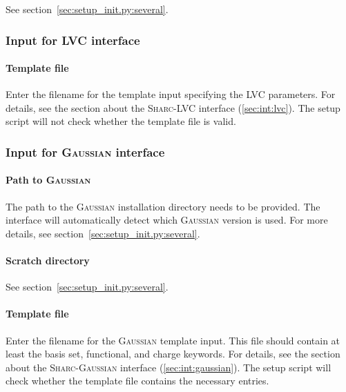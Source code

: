 \documentclass[a4paper,10pt,DIV=15,openany,twoside=false]{scrbook}
\newcommand{\sharc}{\textsc{Sharc}}
\begin{document}
See section~\ref{sec:setup_init.py:several}.


\subsubsection{Input for LVC interface}\label{sec:setup_init.py:lvc}

\paragraph{Template file}

Enter the filename for the template input specifying the LVC parameters. For details, see the section about the \sharc-LVC interface (\ref{sec:int:lvc}). The setup script will not check whether the template file is valid. 


\subsubsection{Input for \textsc{Gaussian} interface}\label{sec:setup_init.py:gaussian}

\paragraph{Path to \textsc{Gaussian}}

The path to the \textsc{Gaussian} installation directory needs to be provided.
The interface will automatically detect which \textsc{Gaussian} version is used.
For more details, see section~\ref{sec:setup_init.py:several}.

\paragraph{Scratch directory}

See section~\ref{sec:setup_init.py:several}.

\paragraph{Template file}

Enter the filename for the \textsc{Gaussian} template input. This file should contain at least the basis set, functional, and charge keywords. For details, see the section about the \sharc-\textsc{Gaussian} interface (\ref{sec:int:gaussian}). The setup script will check whether the template file contains the necessary entries. 
\end{document}
